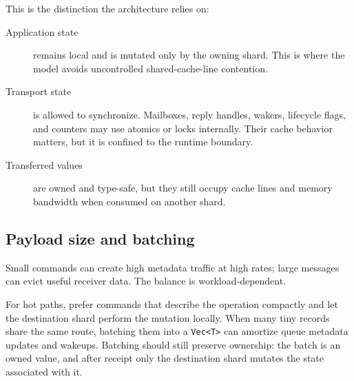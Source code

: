 \begin{center}
\end{center}

This is the distinction the architecture relies on:

\begin{description}
    \item[Application state] remains local and is mutated only by the owning
          shard. This is where the model avoids uncontrolled shared-cache-line
          contention.
    \item[Transport state] is allowed to synchronize. Mailboxes, reply handles,
          wakers, lifecycle flags, and counters may use atomics or locks
          internally. Their cache behavior matters, but it is confined to the
          runtime boundary.
    \item[Transferred values] are owned and type-safe, but they still occupy
          cache lines and memory bandwidth when consumed on another shard.
\end{description}

\subsection{Payload size and batching}

Small commands can create high metadata traffic at high rates; large messages
can evict useful receiver data. The balance is workload-dependent.

For hot paths, prefer commands that describe the operation compactly and let
the destination shard perform the mutation locally. When many tiny records
share the same route, batching them into a \texttt{Vec<T>} can amortize queue
metadata updates and wakeups. Batching should still preserve ownership: the
batch is an owned value, and after receipt only the destination shard mutates
the state associated with it.

